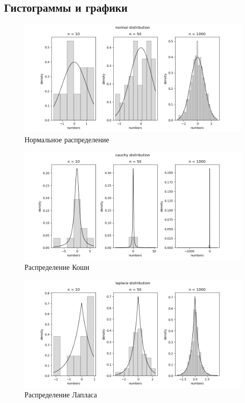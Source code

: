 \documentclass[12pt,a4paper]{article}
\begin{document}
\subsection{Гистограммы и графики}
\begin{figure}[h!]
	\centering
	\includegraphics[scale=0.7]{normal.png}
	\caption{Нормальное распределение}
	\label{fig:image}
\end{figure}

\begin{figure}[h!]
	\centering
	\includegraphics[scale=0.7]{cauchy.png}
	\caption{Распределение Коши}
	\label{fig:image}
\end{figure}

\pagebreak

\begin{figure}[h!]
	\centering
	\includegraphics[scale=0.7]{laplace.png}
	\caption{Распределение Лапласа}
	\label{fig:image}
\end{figure}
\end{document}
